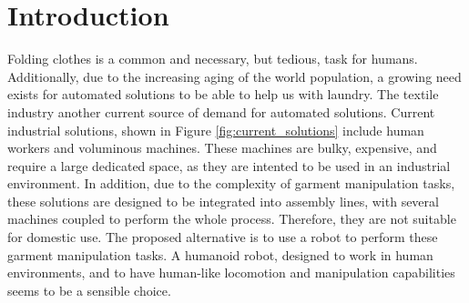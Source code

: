 \chapter{Introduction}
\label{introduction}

Folding clothes is a common and necessary, but tedious, task for humans. Additionally, due to the increasing aging of the world population, a growing need exists for automated solutions to be able to help us with laundry. The textile industry another current source of demand for automated solutions. Current industrial solutions, shown in Figure \ref{fig:current_solutions} include human workers and voluminous machines. These machines are bulky, expensive, and require a large dedicated space, as they are intented to be used in an industrial environment. In addition, due to the complexity of garment manipulation tasks, these solutions are designed to be integrated into  assembly lines, with several machines coupled to perform the whole process. Therefore, they are not suitable for domestic use. The proposed alternative is to use a robot to perform these garment manipulation tasks. A humanoid robot, designed to work in human environments, and to have human-like locomotion and manipulation capabilities seems to be a sensible choice.

